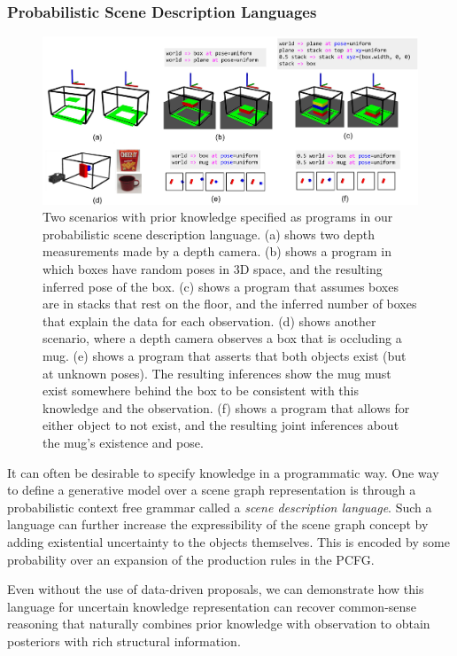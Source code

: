     \subsubsection{Probabilistic Scene Description Languages}

      \begin{figure}
          \centering
          \includegraphics[width=\textwidth]{figures/lafi-fig.pdf}
          \caption{\small
            Two scenarios with prior knowledge specified as programs in our probabilistic scene description language.
            (a) shows two depth measurements made by a depth camera.
            (b) shows a program in which boxes have random poses in 3D space, and the resulting inferred pose of the box.
            (c) shows a program that assumes boxes are in stacks that rest on the floor, and the inferred number of boxes that explain the data for each observation.
            (d) shows another scenario, where a depth camera observes a box that is occluding a mug.
            (e) shows a program that asserts that both objects exist (but at unknown poses).
            The resulting inferences show the mug must exist somewhere behind the box to be consistent with this knowledge and the observation.
            (f) shows a program that allows for either object to not exist, and the resulting joint inferences about the mug's existence and pose.
          }
          \label{fig:results}
      \end{figure}

      It can often be desirable to specify knowledge in a programmatic way. One
      way to define a generative model over a scene graph representation is
      through a probabilistic context free grammar called a \textit{scene
      description language}. Such a language can further increase the
      expressibility of the scene graph concept by adding existential
      uncertainty to the objects themselves. This is encoded by some
      probability over an expansion of the production rules in the PCFG.
      
      Even without the use of data-driven proposals, we can demonstrate how
      this language for uncertain knowledge representation can recover
      common-sense reasoning that naturally combines prior knowledge with
      observation to obtain posteriors with rich structural information.
